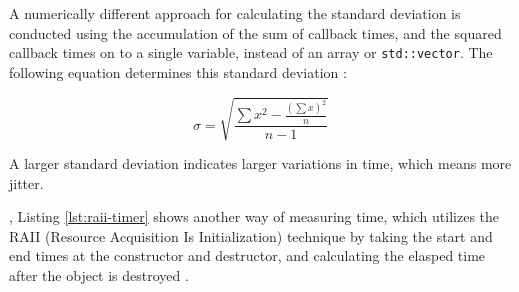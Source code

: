 A numerically different approach for calculating the standard deviation is conducted using the accumulation 
of the sum of callback times, and the squared callback times on to a single variable,
instead of an array or \texttt{std::vector}. The following equation determines this standard deviation 
\cite{haas2022sumofsquares,openai_chatgpt}:

\begin{equation}\label{eq:stddev}
    \sigma = \sqrt{ \frac{\sum x^2 - \frac{\left(\sum x\right)^2}{n} }{n - 1} }
\end{equation}

A larger standard deviation indicates larger variations in time, which means more jitter.

, Listing \ref{lst:raii-timer} shows another way of measuring time, which utilizes the RAII (Resource Acquisition Is Initialization)
technique by taking the start and end times at the constructor and destructor, and calculating the elasped time
after the object is destroyed \cite{nagi2026timingcpp}.
